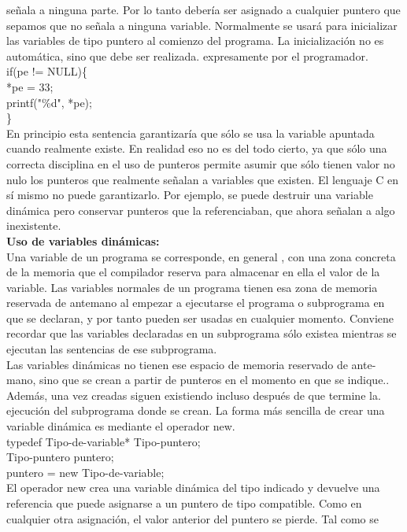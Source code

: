 \documentclass[11pt,a4paper]{article}
\begin{document}
  	señala a ninguna parte. Por lo tanto debería ser asignado a cualquier puntero
  	que sepamos que no señala a ninguna variable. Normalmente se usará
  	para inicializar las variables de tipo puntero al comienzo del programa. La
  	inicialización no es automática, sino que debe ser realizada. expresamente por
  	el programador.\\
  	if(pe != NULL)\{ \\
  	*pe = 33;\\
  	printf("\%d", *pe);\\
  	\}\\
  	En principio esta sentencia garantizaría que sólo se usa la variable apuntada
  	cuando realmente existe. En realidad eso no es del todo cierto, ya que sólo
  	una correcta disciplina en el uso de punteros permite asumir que sólo tienen
  	valor no nulo los punteros que realmente señalan a variables que existen. El lenguaje C en sí mismo no puede garantizarlo. Por ejemplo, se puede destruir una variable dinámica pero conservar punteros que la referenciaban, que ahora señalan a algo inexistente.
  	\\
  	\textbf{Uso de variables dinámicas:}\\
  	Una variable de un programa se corresponde, en general , con una zona concreta
  	de la memoria que el compilador reserva para almacenar en ella el valor de la variable. Las variables normales de un programa tienen esa zona de memoria reservada de antemano al empezar a ejecutarse el programa o subprograma
  	en que se declaran, y por tanto pueden ser usadas en cualquier momento. Conviene recordar que las variables declaradas en un subprograma sólo existea
  	mientras se ejecutan las sentencias de ese subprograma.\\
  	Las variables dinámicas no tienen ese espacio de memoria reservado de ante-mano,
  	sino que se crean a partir de punteros en el momento en que se indique..
  	Además, una vez creadas siguen existiendo incluso después de que termine la.
  	ejecución del subprograma donde se crean. La forma más sencilla de crear una
  	variable dinámica es mediante el operador new.\\
  	typedef Tipo-de-variable* Tipo-puntero;\\
  	Tipo-puntero puntero;\\
  	puntero = new Tipo-de-variable;\\
  	El operador new crea una variable dinámica del tipo indicado y devuelve una referencia que puede asignarse a un puntero de tipo compatible. Como en
  	cualquier otra asignación, el valor anterior del puntero se pierde. Tal como se
\end{document}
